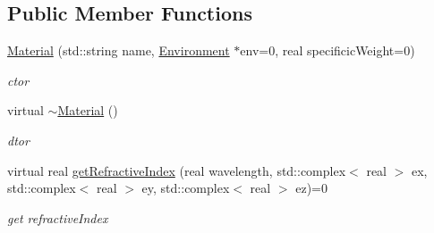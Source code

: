 \subsection*{Public Member Functions}
\begin{DoxyCompactItemize}
\item 
\hyperlink{classMaterial_a6ae071c7815f931869131bba5414cefd}{Material} (std\+::string name, \hyperlink{classEnvironment}{Environment} $\ast$env=0, real specificic\+Weight=0)
\begin{DoxyCompactList}\small\item\em ctor \end{DoxyCompactList}\item 
virtual \hyperlink{classMaterial_a2c19452d71f54075df8f5405b03129f4}{$\sim$\+Material} ()
\begin{DoxyCompactList}\small\item\em dtor \end{DoxyCompactList}\item 
virtual real \hyperlink{classMaterial_a8994560db37896679e16161a7a7cb75b}{get\+Refractive\+Index} (real wavelength, std\+::complex$<$ real $>$ ex, std\+::complex$<$ real $>$ ey, std\+::complex$<$ real $>$ ez)=0\hypertarget{classMaterial_a8994560db37896679e16161a7a7cb75b}{}\label{classMaterial_a8994560db37896679e16161a7a7cb75b}

\begin{DoxyCompactList}\small\item\em get refractive\+Index \end{DoxyCompactList}\end{DoxyCompactItemize}
